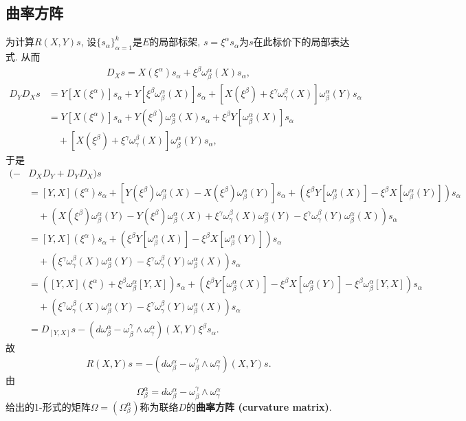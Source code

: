 \subsection{曲率方阵}
为计算$R(X,Y)s$, 设$\{s_\alpha\}_{\alpha=1}^k$是$E$的局部标架, $s=\xi^\alpha s_\alpha$为$s$在此标价下的局部表达式. 从而
$$
\begin{aligned}
D_Xs=X(\xi^\alpha)s_\alpha+\xi^\beta\omega_\beta^\alpha(X) s_\alpha,
\end{aligned}
$$
$$
\begin{aligned}
D_YD_Xs&=Y[X(\xi^\alpha)]s_\alpha+Y[\xi^\beta\omega_\beta^\alpha(X)] s_\alpha
+[X(\xi^\beta)+\xi^\gamma\omega_\gamma^\beta(X)]\omega_\beta^\alpha(Y) s_\alpha \\
&=Y[X(\xi^\alpha)]s_\alpha+Y(\xi^\beta)\omega_\beta^\alpha(X)s_\alpha+\xi^\beta Y[\omega_\beta^\alpha(X)]s_\alpha\\
&\quad+[X(\xi^\beta)+\xi^\gamma\omega_\gamma^\beta(X)]\omega_\beta^\alpha(Y) s_\alpha ,
\end{aligned}
$$
于是
$$
\begin{aligned}
(-&D_XD_Y+D_YD_X)s\\
&=[Y,X](\xi^\alpha)s_\alpha
+[Y(\xi^\beta)\omega_\beta^\alpha(X)-X(\xi^\beta)\omega_\beta^\alpha(Y)]s_\alpha+\left(\xi^\beta Y[\omega_\beta^\alpha(X)]-\xi^\beta X[\omega_\beta^\alpha(Y)]\right)s_\alpha\\
&\quad+\left(X(\xi^\beta)\omega_\beta^\alpha(Y)-Y(\xi^\beta)\omega_\beta^\alpha(X)+\xi^\gamma\omega_\gamma^\beta(X)\omega_\beta^\alpha(Y)-\xi^\gamma\omega_\gamma^\beta(Y)\omega_\beta^\alpha(X) \right)s_\alpha\\
&=[Y,X](\xi^\alpha)s_\alpha+\left(\xi^\beta Y[\omega_\beta^\alpha(X)]-\xi^\beta X[\omega_\beta^\alpha(Y)]\right)s_\alpha\\
&\quad+\left(\xi^\gamma\omega_\gamma^\beta(X)\omega_\beta^\alpha(Y)-\xi^\gamma\omega_\gamma^\beta(Y)\omega_\beta^\alpha(X) \right)s_\alpha\\
&=\left([Y,X](\xi^\alpha)+\xi^\beta\omega_\beta^\alpha[Y,X]\right)s_\alpha
+\left(\xi^\beta Y[\omega_\beta^\alpha(X)]-\xi^\beta X[\omega_\beta^\alpha(Y)]-\xi^\beta\omega_\beta^\alpha[Y,X]\right)s_\alpha\\
&\quad+\left(\xi^\gamma\omega_\gamma^\beta(X)\omega_\beta^\alpha(Y)-\xi^\gamma\omega_\gamma^\beta(Y)\omega_\beta^\alpha(X) \right)s_\alpha\\
&=D_{[Y,X]}s-(d\omega_\beta^\alpha-\omega_\beta^\gamma\wedge\omega_\gamma^\alpha)(X,Y)\xi^\beta s_\alpha.
\end{aligned}
$$
故
$$
R(X,Y)s=-(d\omega_\beta^\alpha-\omega_\beta^\gamma\wedge\omega_\gamma^\alpha)(X,Y)s.
$$
由
$$
\Omega_\beta^\alpha=d\omega_\beta^\alpha-\omega_\beta^\gamma\wedge\omega_\gamma^\alpha
$$
给出的1-形式的矩阵$\Omega=(\Omega_\beta^\alpha)$称为联络$D$的\textbf{曲率方阵 (curvature matrix)}. 

